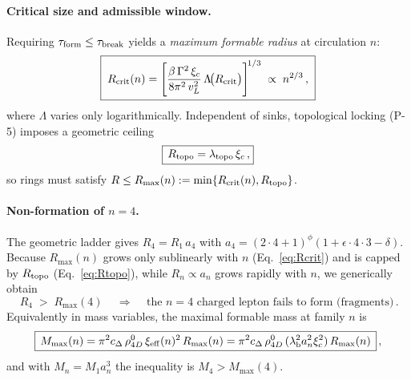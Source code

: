 \paragraph{Critical size and admissible window.}
Requiring \(\tau_{\rm form}\le\tau_{\rm break}\) yields a \emph{maximum formable radius} at circulation \(n\):
\begin{equation}
\boxed{\;
R_{\rm crit}(n)=\Bigg[\frac{\beta\,\Gamma^{2}\,\xi_c}{8\pi^{2}\,v_L^{2}}\,\Lambda\!\big(R_{\rm crit}\big)\Bigg]^{\!1/3}
\;\propto\; n^{2/3}\,,\;
}
\label{eq:Rcrit}
\end{equation}
where \(\Lambda\) varies only logarithmically. Independent of sinks, topological locking (P-5) imposes a geometric ceiling
\begin{equation}
\boxed{\,R_{\rm topo}=\lambda_{\rm topo}\,\xi_c\,,}
\label{eq:Rtopo}
\end{equation}
so rings must satisfy \(R\le R_{\max}(n):=\min\{R_{\rm crit}(n),R_{\rm topo}\}\).

\paragraph{Non-formation of \(n{=}4\).}
The geometric ladder gives \(R_4=R_1\,a_4\) with \(a_4=(2\cdot4+1)^\phi(1+\epsilon\cdot 4\cdot3-\delta)\). Because \(R_{\max}(n)\) grows only sublinearly with \(n\) (Eq.~\eqref{eq:Rcrit}) and is capped by \(R_{\rm topo}\) (Eq.~\eqref{eq:Rtopo}), while \(R_n\propto a_n\) grows rapidly with \(n\), we generically obtain
\begin{equation}
\boxed{\,R_4\;>\;R_{\max}(4)\,}\quad\Longrightarrow\quad
\boxed{\,\text{the $n{=}4$ charged lepton fails to form (fragments)}\,}.
\label{eq:no4}
\end{equation}
Equivalently in mass variables, the maximal formable mass at family \(n\) is
\begin{equation}
\boxed{\,M_{\max}(n)=\pi^2 c_\Delta\,\rho_{4D}^0\,\xi_{\rm eff}(n)^{2}\,R_{\max}(n)
= \pi^2 c_\Delta\,\rho_{4D}^0\,(\lambda_{\rm b}^2 a_n^2 \xi_c^2)\,R_{\max}(n)\,}\,,
\label{eq:Mmax}
\end{equation}
and with \(M_n=M_1 a_n^3\) the inequality is \(M_4>M_{\max}(4)\).


